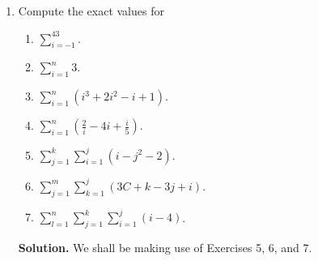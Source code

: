 \documentclass[9pt]{article}
\newcommand{\D}{\displaystyle}
\begin{document}
\begin{enumerate}
   \item Compute the exact values for

         \begin{enumerate}
            \item $\D\sum_{i=-1}^43$.
            \item $\D\sum_{i=1}^n3$.
            \item $\D\sum_{i=1}^n (i^3 + 2i^2 - i + 1)$.
            \item $\D\sum_{i=1}^n \left(\frac{2}{i} - 4i + \frac{i}{5}\right)$.
            \item $\D\sum_{j=1}^k\sum_{i=1}^j (i - j^2 - 2)$.
            \item $\D\sum_{j=1}^m\sum_{k=1}^j (3C + k - 3j + i)$.
            \item $\D\sum_{l=1}^n\sum_{j=1}^k\sum_{i=1}^j (i - 4)$.
         \end{enumerate}
      
      \textbf{Solution.} We shall be making use of Exercises 5, 6, and 7.


\end{enumerate}
\end{document}
